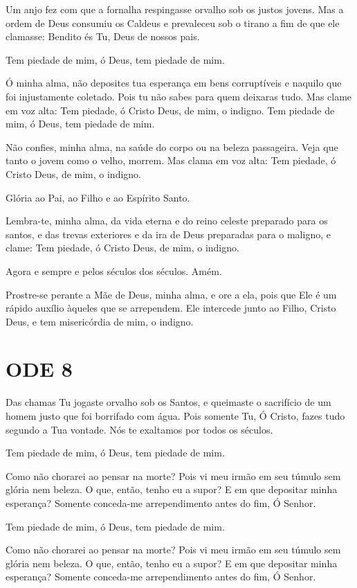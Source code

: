 \documentclass{subfiles}
\begin{document}
\eirmos{}Um anjo fez com que a fornalha respingasse orvalho sob os justos
jovens. Mas a ordem de Deus consumiu os Caldeus e prevaleceu sob o tirano
a fim de que ele clamasse: Bendito és Tu, Deus de nossos pais.

Tem piedade de mim, ó Deus, tem piedade de mim.

Ó minha alma, não deposites tua esperança em bens corruptíveis e
naquilo que foi injustamente coletado. Pois tu não sabes para quem deixaras
tudo. Mas clame em voz alta: Tem piedade, ó Cristo Deus, de mim, o indigno.
Tem piedade de mim, ó Deus, tem piedade de mim.

Não confies, minha alma, na saúde do corpo ou na beleza passageira.
Veja que tanto o jovem como o velho, morrem. Mas clama em voz alta: Tem
piedade, ó Cristo Deus, de mim, o indigno.

Glória ao Pai, ao Filho e ao Espírito Santo.

Lembra-te, minha alma, da vida eterna e do reino celeste preparado
para os santos, e das trevas exteriores e da ira de Deus preparadas para o
maligno, e clame: Tem piedade, ó Cristo Deus, de mim, o indigno.

Agora e sempre e pelos séculos dos séculos. Amém.

\theotokion{}Prostre-se perante a Mãe de Deus, minha alma, e ore a ela, pois
que Ele é um rápido auxílio àqueles que se arrependem. Ele intercede junto ao
Filho, Cristo Deus, e tem misericórdia de mim, o indigno.


\section*{ODE 8}

\eirmos{}Das chamas Tu jogaste orvalho sob os Santos, e queimaste o sacrifício
de um homem justo que foi borrifado com água. Pois somente Tu, Ó Cristo,
fazes tudo segundo a Tua vontade. Nós te exaltamos por todos os séculos.

Tem piedade de mim, ó Deus, tem piedade de mim.

Como não chorarei ao pensar na morte? Pois vi meu irmão em seu
túmulo sem glória nem beleza. O que, então, tenho eu a supor? E em que
depositar minha esperança? Somente conceda-me arrependimento antes do
fim, Ó Senhor.

Tem piedade de mim, ó Deus, tem piedade de mim.

Como não chorarei ao pensar na morte? Pois vi meu irmão em seu
túmulo sem glória nem beleza. O que, então, tenho eu a supor? E em que
depositar minha esperança? Somente conceda-me arrependimento antes do
fim, Ó Senhor.
\end{document}
